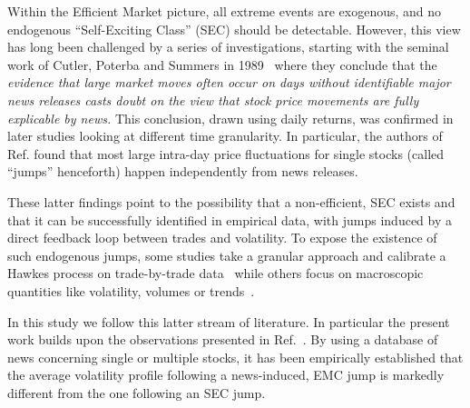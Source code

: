 \documentclass[amsmath,amssymb,aps,pre,floatfix,twocolumn,superscriptaddress]{revtex4}
\begin{document}
Within the Efficient Market picture, all extreme events are exogenous, and no endogenous ``Self-Exciting Class'' (SEC) should be detectable. However, this view has long been challenged by a series of investigations, starting with the seminal work of Cutler, Poterba and Summers in 1989~\cite{vol_news_1} where they conclude that the {\it evidence that large market moves often occur on days without identifiable major news releases casts doubt on the view that stock price movements are fully explicable by news.} This conclusion, drawn using daily returns, was confirmed in later studies \cite{vol_news_2,vol_news_3} looking at different time granularity. In particular, the authors of Ref. \cite{vol_news_jp} found that most  large intra-day price fluctuations for single stocks (called ``jumps'' henceforth) happen independently from news releases. 

These latter findings point to the possibility that a non-efficient, SEC exists and that it can be successfully identified in empirical data, with jumps induced by a direct feedback loop between  trades and volatility. To expose the existence of such endogenous jumps, some studies take a granular approach and calibrate a Hawkes process on trade-by-trade data~\cite{filimonov2012quantifying,hardiman2013critical,wheatley2019endo,koyama2020statistical} while others focus on macroscopic quantities like volatility, volumes or trends~\cite{sornette2004volatility, quadratic_hawkes, fosset2020endogenous}. 

In this study we follow this latter stream of literature. In particular the present work builds upon the observations presented in Ref.~\cite{vol_news_jp}. By using a database of news concerning single or multiple stocks, it has been empirically established that the average volatility profile following a news-induced, EMC jump is markedly different from the one following an SEC jump.
\end{document}
